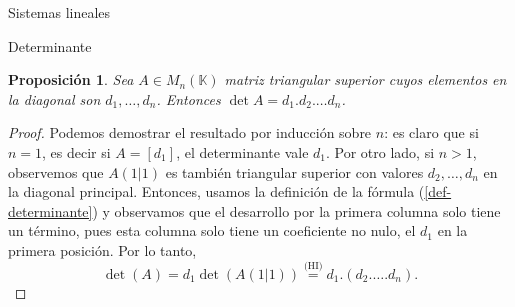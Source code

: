 \documentclass[a4paper,12pt,twoside,spanish]{amsbook}
\newtheorem{proposicion}[teorema]{Proposici\'on}
\theoremstyle{definition}
\theoremstyle{remark}
\newcommand{\K}{\mathbb K}
\begin{document}
\begin{chapter}{Sistemas lineales}
\begin{section}{Determinante}
	\begin{comment}
		\begin{proposicion}
		Sea $A \in M_n(\K)$ matriz triangular  cuyos elementos en la diagonal son $d_1,\ldots,d_n$. Entonces $\det A = d_1.d_2.\ldots d_n$.
		\end{proposicion}
		\begin{proof} Si $A$ es triangular superior podemos demostrar el resultado por inducción sobre $n$: es claro que si $n=1$,  es decir si $A = [d_1]$, el determinante vale $d_1$. Por otro lado, si $n>1$,  observemos que $A(1|1)$ es también triangular superior con valores $d_2,\ldots,d_n$  en la diagonal principal. Entonces,  usamos la definición de la fórmula (\ref{def-determinante}) y observamos que el desarrollo por la primera  columna solo tiene un término, pues esta columna solo tiene un coeficiente no nulo, el $d_1$ en la primera posición. Por lo tanto, 
		\begin{equation*}
		\det(A) = d_1 \det(A(1|1)) \stackrel{\text{(HI)}}{=} d_1.(d_2.\ldots.d_n).
		\end{equation*}
		
		En  el caso  que  $A$ sea triangular inferior también lo demostraremos por inducción. El caso $n=1$ es trivial. Si $n >1$, observemos que  $A(1|1)$ es también triangular inferior con valores $d_2,\ldots,d_n$  en la diagonal principal y si $i >1$, $A(i|1)$ es triangular inferior con el primer valor en la diagonal igual a 0. Por hipótesis inductiva $\det(A(1|1)) = d_2.\ldots.d_n$ y si $i >1$, $\det(A(i|1)) = 0\times \ldots = 0$, por lo tanto 
		\begin{equation*}
		\det(A) = d_1 \det(A(1|1))+ \sum_{i=2}^{n} a_{i1}\det(A(i|1)) =  d_1.(d_2.\ldots.d_n) + 0.
		\end{equation*} 
		\end{proof}
	\end{comment}

	\begin{proposicion}\label{det-triang-sup}
	Sea $A \in M_n(\K)$ matriz triangular  superior cuyos elementos en la diagonal son $d_1,\ldots,d_n$. Entonces $\det A = d_1.d_2.\ldots d_n$.
	\end{proposicion}
	\begin{proof} Podemos demostrar el resultado por inducción sobre $n$: es claro que si $n=1$,  es decir si $A = [d_1]$, el determinante vale $d_1$. Por otro lado, si $n>1$,  observemos que $A(1|1)$ es también triangular superior con valores $d_2,\ldots,d_n$  en la diagonal principal. Entonces,  usamos la definición de la fórmula (\ref{def-determinante}) y observamos que el desarrollo por la primera  columna solo tiene un término, pues esta columna solo tiene un coeficiente no nulo, el $d_1$ en la primera posición. Por lo tanto, 
		\begin{equation*}
		\det(A) = d_1 \det(A(1|1)) \stackrel{\text{(HI)}}{=} d_1.(d_2.\ldots.d_n).
		\end{equation*}
	\end{proof}
	

\end{section}
\end{chapter}
\end{document}
